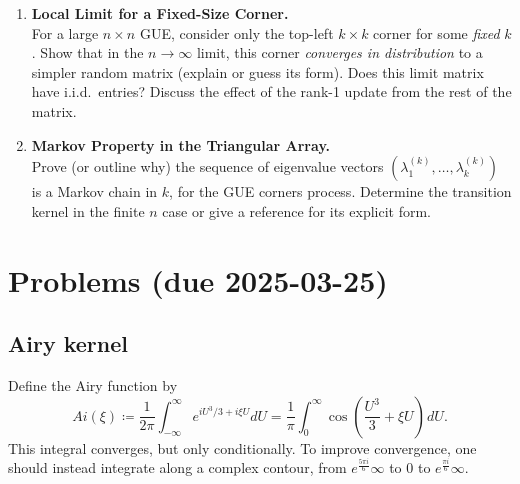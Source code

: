 \documentclass[letterpaper,11pt,oneside,reqno]{article}
\numberwithin{equation}{section}
\newcommand{\ssp}{\hspace{1pt}}
\theoremstyle{definition}
\begin{document}
\begin{enumerate}
\item \textbf{Local Limit for a Fixed-Size Corner.} \\
For a large $n\times n$ GUE, consider only the top-left $k\times k$ corner for some \emph{fixed} $k$. Show that in the $n\to\infty$ limit, this corner \emph{converges in distribution} to a simpler random matrix (explain or guess its form). Does this limit matrix have i.i.d.\ entries? Discuss the effect of the rank-1 update from the rest of the matrix.
\medskip

\item \textbf{Markov Property in the Triangular Array.} \\
Prove (or outline why) the sequence of eigenvalue vectors $(\lambda_1^{(k)},\dots,\lambda_k^{(k)})$ is a Markov chain in $k$, for the GUE corners process. Determine the transition kernel in the finite $n$ case or give a reference for its explicit form.
\end{enumerate}





































\appendix
\setcounter{section}{6}

\section{Problems (due 2025-03-25)}

\subsection{Airy kernel}
\label{prob:airy}

Define the Airy function by
\begin{equation*}
	Ai(\xi)\coloneqq
	\frac{1}{2\pi}\int_{-\infty}^\infty
	e^{i U^3/3+i\xi U} dU=
	\frac{1}{\pi}\int_0^\infty
	\cos\left( \frac{U^3}{3}+\xi U \right)\ssp dU.
\end{equation*}
This integral converges, but only conditionally. To improve convergence,
one should instead integrate
along a complex contour,
from $e^{\frac{5 \pi i}{6}}\infty$ to $0$ to
$e^{\frac{\pi i}{6}}\infty$.
\end{document}
